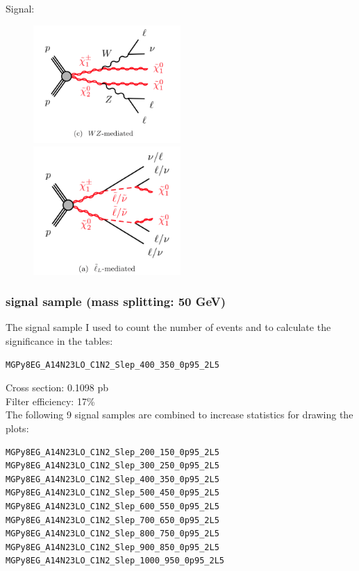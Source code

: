 \documentclass[mathserif,serif]{beamer}
\begin{document}
\begin{frame}
\small
Signal:\\
\begin{figure}
\includegraphics[width=0.5\textwidth]{data/WZ.png}
\includegraphics[width=0.5\textwidth]{data/slepton.png}
\end{figure}
\end{frame}

\begin{frame}[fragile]
\frametitle{signal sample (mass splitting: 50 GeV)}
\small
The signal sample I used to count the number of events and to calculate the significance in the tables:
\tiny
\begin{verbatim}
MGPy8EG_A14N23LO_C1N2_Slep_400_350_0p95_2L5
\end{verbatim}
\small
Cross section: 0.1098 pb \\
Filter efficiency: 17\% \\
\vspace{5mm}
The following 9 signal samples are combined to increase statistics for drawing the plots:
\tiny
\begin{verbatim}
MGPy8EG_A14N23LO_C1N2_Slep_200_150_0p95_2L5
MGPy8EG_A14N23LO_C1N2_Slep_300_250_0p95_2L5
MGPy8EG_A14N23LO_C1N2_Slep_400_350_0p95_2L5
MGPy8EG_A14N23LO_C1N2_Slep_500_450_0p95_2L5
MGPy8EG_A14N23LO_C1N2_Slep_600_550_0p95_2L5
MGPy8EG_A14N23LO_C1N2_Slep_700_650_0p95_2L5
MGPy8EG_A14N23LO_C1N2_Slep_800_750_0p95_2L5
MGPy8EG_A14N23LO_C1N2_Slep_900_850_0p95_2L5
MGPy8EG_A14N23LO_C1N2_Slep_1000_950_0p95_2L5
\end{verbatim}
\end{frame}
\end{document}
